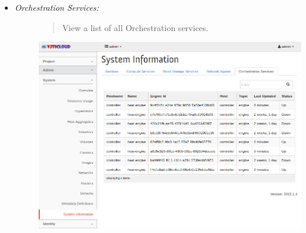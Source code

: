 \documentclass[letterpaper,10pt,english]{sphinxmanual}
\begin{document}
\begin{description}
\begin{itemize}
\begin{description}
\end{description}

\item {} \begin{description}
\item[{\emph{Orchestration Services:}}] \leavevmode\begin{quote}

View a list of all Orchestration services.
\end{quote}

\includegraphics{sys_orchestration_services.png}

\end{description}

\end{itemize}

\end{description}
\end{document}
